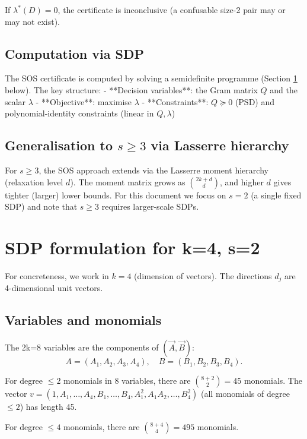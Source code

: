 \documentclass[12pt,a4paper]{article}
\begin{document}
If $\lambda^*(D) = 0$, the certificate is inconclusive (a confusable size-2 pair may or may not exist).

\subsection*{Computation via SDP}

The SOS certificate is computed by solving a semidefinite programme (Section
\ref{sec:sdp-formulation} below).  The key structure:
- **Decision variables**: the Gram matrix $Q$ and the scalar $\lambda$
- **Objective**: maximise $\lambda$
- **Constraints**: $Q \succeq 0$ (PSD) and polynomial-identity constraints (linear in $Q, \lambda$)

\subsection*{Generalisation to $s \geq 3$ via Lasserre hierarchy}

For $s \geq 3$, the SOS approach extends via the Lasserre moment hierarchy (relaxation
level $d$).  The moment matrix grows as $\binom{2k+d}{d}$, and higher $d$ gives tighter
(larger) lower bounds.  For this document we focus on $s=2$ (a single fixed SDP) and
note that $s \geq 3$ requires larger-scale SDPs.

\section{SDP formulation for k=4, s=2}
\label{sec:sdp-formulation}

For concreteness, we work in $k=4$ (dimension of vectors).  The directions $d_j$ are
4-dimensional unit vectors.

\subsection*{Variables and monomials}

The 2k=8 variables are the components of $(\vec{A}, \vec{B})$:
$$A = (A_1, A_2, A_3, A_4), \quad B = (B_1, B_2, B_3, B_4).$$

For degree $\leq 2$ monomials in 8 variables, there are $\binom{8+2}{2} = 45$ monomials.
The vector $v = (1, A_1, \ldots, A_4, B_1, \ldots, B_4, A_1^2, A_1 A_2, \ldots, B_4^2)$
(all monomials of degree $\leq 2$) has length 45.

For degree $\leq 4$ monomials, there are $\binom{8+4}{4} = 495$ monomials.
\end{document}

